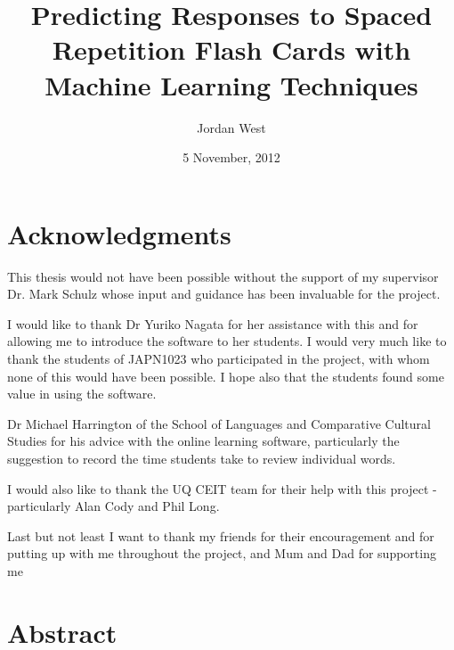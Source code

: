 \documentclass[12pt,a4paper,twoside,openright]{book}
\title{Predicting Responses to Spaced Repetition Flash Cards with Machine Learning Techniques}
\date{5 November, 2012}
\author{Jordan West}
\begin{document}
\frontmatter


\cleardoublepage



\chapter*{Acknowledgments}
This thesis would not have been possible without the support of my
supervisor Dr. Mark Schulz whose input and guidance
has been invaluable for the project.

I would like to thank Dr Yuriko Nagata for her assistance with this and for allowing
me to introduce the software to her students. I would very much like to thank the students
of JAPN1023 who participated in the project, with whom none of this would have been possible.
I hope also that the students found some value in using the software.

Dr Michael Harrington of the School of Languages and Comparative Cultural Studies
for his advice with the online learning software, particularly the suggestion
to record the time students take to review individual words.

I would also like to thank the UQ CEIT team for their help with this project -
particularly Alan Cody and Phil Long.

Last but not least I want to thank my friends for their encouragement and
for putting up with me throughout the project, and Mum and Dad for supporting me

\chapter*{Abstract}
\newpage

\tableofcontents

\mainmatter








%
%
\printbibliography

\appendix
\end{document}
